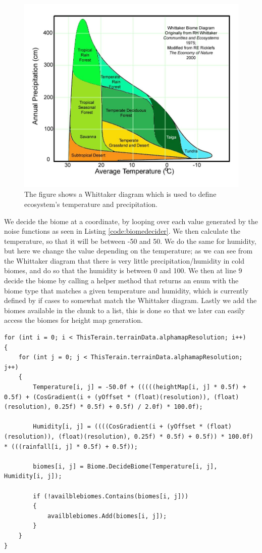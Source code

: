 \begin{figure}[H]
	\includegraphics[width=1\linewidth]{img/whittaker}
	\centering
	\caption{The figure shows a Whittaker diagram which is used to define ecosystem's temperature and precipitation.}
	\label{fig:whittaker}
\end{figure}

We decide the biome at a coordinate, by looping over each value generated by the noise functions as seen in Listing \ref{code:biomedecider}. We then calculate the temperature, so that it will be between -50 and 50. We do the same for humidity, but here we change the value depending on the temperature; as we can see from the Whittaker diagram that there is very little precipitation/humidity in cold biomes, and do so that the humidity is between 0 and 100. We then at line 9 decide the biome by calling a helper method that returns an enum with the biome type that matches a given temperature and humidity, which is currently defined by if cases to somewhat match the Whittaker diagram. Lastly we add the biomes available in the chunk to a list, this is done so that we later can easily access the biomes for height map generation.

\begin{lstlisting}[caption = A code snippet from the chunk class in our project., label=code:biomedecider, language=Csharp]
for (int i = 0; i < ThisTerain.terrainData.alphamapResolution; i++)
{
	for (int j = 0; j < ThisTerain.terrainData.alphamapResolution; j++)
    {
        Temperature[i, j] = -50.0f + (((((heightMap[i, j] * 0.5f) + 0.5f) + (CosGradient(i + (yOffset * (float)(resolution)), (float)(resolution), 0.25f) * 0.5f) + 0.5f) / 2.0f) * 100.0f);
        
        Humidity[i, j] = ((((CosGradient(i + (yOffset * (float)(resolution)), (float)(resolution), 0.25f) * 0.5f) + 0.5f)) * 100.0f) * (((rainfall[i, j] * 0.5f) + 0.5f));
       
        biomes[i, j] = Biome.DecideBiome(Temperature[i, j], Humidity[i, j]);
        
        if (!availblebiomes.Contains(biomes[i, j]))
        {
        	availblebiomes.Add(biomes[i, j]);
        }	
	}
}
\end{lstlisting}


